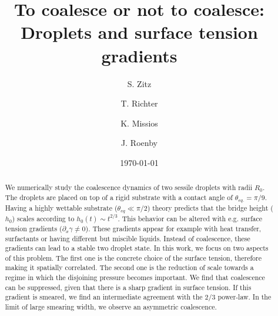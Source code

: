 \documentclass[twocolumn,amsmath,amssymb,showpacs,nofootinbib,prfluids,superscriptaddress]{revtex4-2} %
\begin{document}

\title{To coalesce or not to coalesce: Droplets and surface tension gradients}

\author{S. Zitz}
 \author{T. Richter}%
 \author{K. Missios}%
 \author{J. Roenby}%
\date{\today}

\begin{abstract}
We numerically study the coalescence dynamics of two sessile droplets with radii $R_0$.
The droplets are placed on top of a rigid substrate with a contact angle of $\theta_{eq.} = \pi/9$. 
Having a highly wettable substrate ($\theta_{eq} \ll \pi/2$) theory predicts that the bridge height ($h_0$) scales according to $h_0(t) \sim t^{2/3}.$
This behavior can be altered with e.g. surface tension gradients ($\partial_x\gamma \neq 0$). 
These gradients appear for example with heat transfer, surfactants or having different but miscible liquids.
Instead of coalescence, these gradients can lead to a stable two droplet state. 
In this work, we focus on two aspects of this problem.
The first one is the concrete choice of the surface tension, therefore making it spatially correlated.
The second one is the reduction of scale towards a regime in which the disjoining pressure becomes important. 
We find that coalescence can be suppressed, given that there is a sharp gradient in surface tension.
If this gradient is smeared, we find an intermediate agreement with the $2/3$ power-law.
In the limit of large smearing width, we observe an asymmetric coalescence.
\end{abstract}
\end{document}
